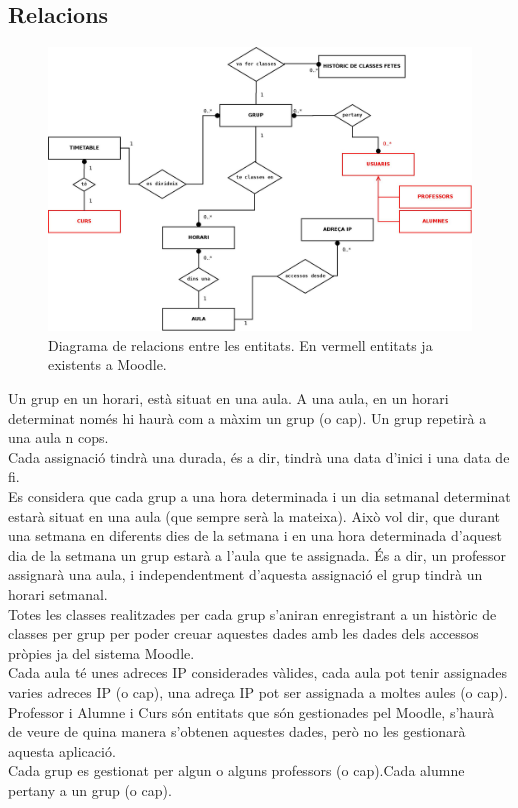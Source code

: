 \documentclass[a4paper]{report}  %
\begin{document}
\subsection{Relacions}\label{relacions-rf}
		\begin{figure}[H] %
		\begin{center}
		\includegraphics[width=14cm,keepaspectratio]{img/DiagramaRelacions-rf.jpg}
		\caption[List caption]{Diagrama de relacions entre les entitats. En vermell entitats ja existents a Moodle.}
		\label{fig:DiagramaRelacions-rf}
		\end{center}
		\end{figure}
Un grup en un horari, està situat en una aula. A una aula, en un horari determinat només hi haurà com a màxim un grup (o cap). Un grup repetirà a una aula n cops.\\
Cada assignació tindrà una durada, és a dir, tindrà una data d’inici i una data de fi.\\
Es considera que cada grup a una hora determinada i un dia setmanal  determinat estarà situat en una aula (que sempre serà la mateixa). Això vol dir, que durant una setmana en diferents dies de la setmana i en una hora determinada d’aquest dia de la setmana un grup estarà a l’aula que te assignada. És a dir, un professor assignarà una aula, i independentment d’aquesta assignació el grup tindrà un horari setmanal.\\
Totes les classes realitzades per cada grup s'aniran enregistrant a un històric de classes per grup per poder creuar  aquestes dades amb les dades dels accessos pròpies ja del sistema Moodle.\\
Cada aula té unes adreces IP considerades vàlides, cada aula pot tenir assignades varies adreces IP (o cap), una adreça IP pot ser assignada a moltes aules (o cap).\\
Professor i Alumne i Curs són entitats que són gestionades pel Moodle, s’haurà de veure de quina manera s’obtenen aquestes dades, però no les gestionarà aquesta aplicació.\\
Cada grup es gestionat per algun o alguns professors (o cap).Cada alumne pertany a un grup (o cap).\\
\end{document}
